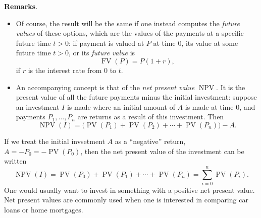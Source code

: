 \documentclass[12pt]{article}
\begin{document}
\textbf{Remarks}.
\begin{itemize}
\item
Of course, the result will be the same if one instead computes the \emph{future values} of these options, which are the values of the payments at a specific future time $t>0$: if payment is valued at $P$ at time $0$, its value at some future time $t>0$, or its \emph{future value} is 
$$\operatorname{FV}(P)=P(1+r),$$ if $r$ is the interest rate from $0$ to $t$.
\item
An accompanying concept is that of the \emph{net present value} $\operatorname{NPV}$.  It is the present value of all the future payments minus the initial investment: suppose an investment $I$ is made where an initial amount of $A$ is made at time $0$, and payments $P_1,\ldots,P_n$ are returns as a result of this investment.  Then 
$$\operatorname{NPV}(I)=\Big(\operatorname{PV}(P_1)+\operatorname{PV}(P_2)+\cdots  +\operatorname{PV}(P_n)\Big)-A.$$
\end{itemize}
If we treat the initial invsetment $A$ as a ``negative'' return, $A=-P_0=-\operatorname{PV}(P_0)$, then the net present value of the investment can be written
$$\operatorname{NPV}(I)=\operatorname{PV}(P_0)+\operatorname{PV}(P_1)+\cdots  +\operatorname{PV}(P_n)=\sum_{i=0}^n \operatorname{PV}(P_i).$$
One would usually want to invest in something with a positive net present value.  Net present values are commonly used when one is interested in comparing car loans or home mortgages.
\end{document}
